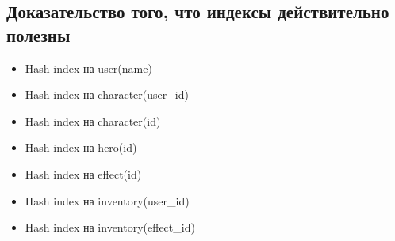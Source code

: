 \subsection*{Доказательство того, что индексы действительно полезны}


\begin{itemize}
    \item Hash index на user(name)
    
    \item Hash index на character(user\_id)
    
    \item Hash index на character(id)

    \item Hash index на hero(id)

    \item Hash index на effect(id)

    \item Hash index на inventory(user\_id)

    \item Hash index на inventory(effect\_id)
\end{itemize}
